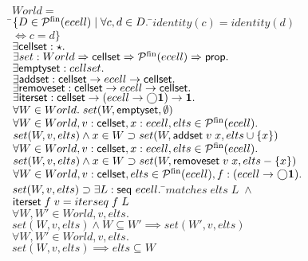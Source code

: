\documentclass[preprint,natbib]{sigplanconf}
\begin{document}
\begin{tabbing}
$World = $ \\
\;\;\;\;\=$\{D \in \mathcal{P}^{\mathrm{fin}}({ecell})\;|\;\forall c,d \in D.\;$\=$identity(c) = identity(d)$\\
        \>                                                      \>$\iff c = d\}$\\[1em]

$\exists \mbox{\textsf{{cellset}}} : \star.$ \\
$\exists set : World \Rightarrow \mbox{\textsf{{cellset}}} \Rightarrow \mathcal{P}^{\mathrm{fin}}({ecell}) \Rightarrow \mbox{\textsf{{prop}}}.$ \\
$\exists \mbox{\textsf{{emptyset}}}    : cellset.$ \\
$\exists \mbox{\textsf{{addset}}}      : \mbox{\textsf{{cellset}}} \to ecell \to \mbox{\textsf{{cellset}}}.$ \\
$\exists \mbox{\textsf{{removeset}}}   : \mbox{\textsf{{cellset}}} \to ecell \to \mbox{\textsf{{cellset}}}.$ \\
$\exists \mbox{\textsf{{iterset}}}     : \mbox{\textsf{{cellset}}} \to (ecell \to \bigcirc{\mathbf{1}}) \to \mathbf{1}.$\\[1em]

$\forall W \in World.\; set(W, \mbox{\textsf{{emptyset}}}, \emptyset)$ \\[1em]


$\forall W \in World, v : \mbox{\textsf{{cellset}}}, x : ecell, elts \in \mathcal{P}^{\mathrm{fin}}({ecell}).$ \\ 
\> $set(W, v, elts) \land x \in W \supset set(W, \mbox{\textsf{{addset}}}\;v\;x, elts \cup \{{x}\})$ \\[1em]


$\forall W \in World, v : \mbox{\textsf{{cellset}}}, x : ecell, elts \in \mathcal{P}^{\mathrm{fin}}({ecell}).$ \\ 
\> $set(W, v, elts) \land x \in W \supset set(W, \mbox{\textsf{{removeset}}}\;v\;x, elts - \{{x}\})$ \\[1em]


$\forall W \in World, v : \mbox{\textsf{{cellset}}}, elts \in \mathcal{P}^{\mathrm{fin}}({ecell}), 
         f : (ecell \to \bigcirc{\mathbf{1}}).$ \\ 
\> $set(W, v, elts) \supset \exists L : \mbox{\textsf{{seq }}}{ecell}.\;$\=$matches\;elts\;L\; \land$ \\
\>                                \>$\mbox{\textsf{{iterset}}}\;f\;v = iterseq\;f\;L$ \\[1em]


$\forall W, W' \in World, v, elts.$ \\
\>$set(W,v,elts) \land W \subseteq W' \implies set(W',v, elts)$\\[1em]

$\forall W, W' \in World, v, elts.$ \\
\>$set(W, v, elts) \implies elts \subseteq W$ \\[1em]


\end{tabbing}
\end{document}
